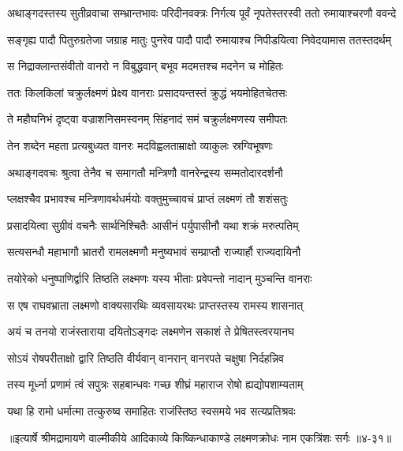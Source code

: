 \twolineshloka
{अथाङ्गदस्तस्य सुतीव्रवाचा सम्भ्रान्तभावः परिदीनवक्त्रः}
{निर्गत्य पूर्वं नृपतेस्तरस्वी ततो रुमायाश्चरणौ ववन्दे} %

\twolineshloka
{सङ्गृह्य पादौ पितुरुग्रतेजा जग्राह मातुः पुनरेव पादौ}
{पादौ रुमायाश्च निपीडयित्वा निवेदयामास ततस्तदर्थम्} %

\twolineshloka
{स निद्राक्लान्तसंवीतो वानरो न विबुद्धवान्}
{बभूव मदमत्तश्च मदनेन च मोहितः} %

\twolineshloka
{ततः किलकिलां चक्रुर्लक्ष्मणं प्रेक्ष्य वानराः}
{प्रसादयन्तस्तं क्रुद्धं भयमोहितचेतसः} %

\twolineshloka
{ते महौघनिभं दृष्ट्वा वज्राशनिसमस्वनम्}
{सिंहनादं समं चक्रुर्लक्ष्मणस्य समीपतः} %

\twolineshloka
{तेन शब्देन महता प्रत्यबुध्यत वानरः}
{मदविह्वलताम्राक्षो व्याकुलः स्रग्विभूषणः} %

\twolineshloka
{अथाङ्गदवचः श्रुत्वा तेनैव च समागतौ}
{मन्त्रिणौ वानरेन्द्रस्य सम्मतोदारदर्शनौ} %

\twolineshloka
{प्लक्षश्चैव प्रभावश्च मन्त्रिणावर्थधर्मयोः}
{वक्तुमुच्चावचं प्राप्तं लक्ष्मणं तौ शशंसतुः} %

\twolineshloka
{प्रसादयित्वा सुग्रीवं वचनैः सार्थनिश्चितैः}
{आसीनं पर्युपासीनौ यथा शक्रं मरुत्पतिम्} %

\twolineshloka
{सत्यसन्धौ महाभागौ भ्रातरौ रामलक्ष्मणौ}
{मनुष्यभावं सम्प्राप्तौ राज्यार्हौ राज्यदायिनौ} %

\twolineshloka
{तयोरेको धनुष्पाणिर्द्वारि तिष्ठति लक्ष्मणः}
{यस्य भीताः प्रवेपन्तो नादान् मुञ्चन्ति वानराः} %

\twolineshloka
{स एष राघवभ्राता लक्ष्मणो वाक्यसारथिः}
{व्यवसायरथः प्राप्तस्तस्य रामस्य शासनात्} %

\twolineshloka
{अयं च तनयो राजंस्ताराया दयितोऽङ्गदः}
{लक्ष्मणेन सकाशं ते प्रेषितस्त्वरयानघ} %

\twolineshloka
{सोऽयं रोषपरीताक्षो द्वारि तिष्ठति वीर्यवान्}
{वानरान् वानरपते चक्षुषा निर्दहन्निव} %

\twolineshloka
{तस्य मूर्ध्ना प्रणामं त्वं सपुत्रः सहबान्धवः}
{गच्छ शीघ्रं महाराज रोषो ह्यद्योपशाम्यताम्} %

\twolineshloka
{यथा हि रामो धर्मात्मा तत्कुरुष्व समाहितः}
{राजंस्तिष्ठ स्वसमये भव सत्यप्रतिश्रवः} %


॥इत्यार्षे श्रीमद्रामायणे वाल्मीकीये आदिकाव्ये किष्किन्धाकाण्डे लक्ष्मणक्रोधः नाम एकत्रिंशः सर्गः ॥४-३१॥
